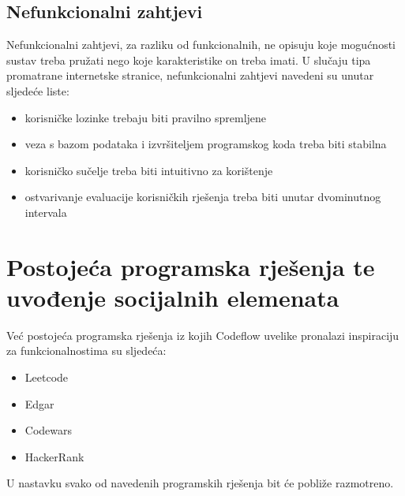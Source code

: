 \documentclass[times, utf8, zavrsni]{fer}
\begin{document}
	\section{Nefunkcionalni zahtjevi}
	Nefunkcionalni zahtjevi, za razliku od funkcionalnih, ne opisuju koje mogućnosti sustav treba pružati nego koje karakteristike on treba imati. U slučaju tipa promatrane internetske stranice, nefunkcionalni zahtjevi navedeni su unutar sljedeće liste:
	\begin{itemize}
		\item korisničke lozinke trebaju biti pravilno spremljene
		\item veza s bazom podataka i izvršiteljem programskog koda treba biti stabilna
		\item korisničko sučelje treba biti intuitivno za korištenje
		\item ostvarivanje evaluacije korisničkih rješenja treba biti unutar dvominutnog intervala 
	\end{itemize}
\chapter{Postojeća programska rješenja te uvođenje socijalnih elemenata}
Već postojeća programska rješenja iz kojih Codeflow uvelike pronalazi inspiraciju za funkcionalnostima su sljedeća:
\begin{itemize}
	\item Leetcode
	\item Edgar
	\item Codewars
	\item HackerRank
\end{itemize}
U nastavku svako od navedenih programskih rješenja bit će pobliže razmotreno.
\end{document}
